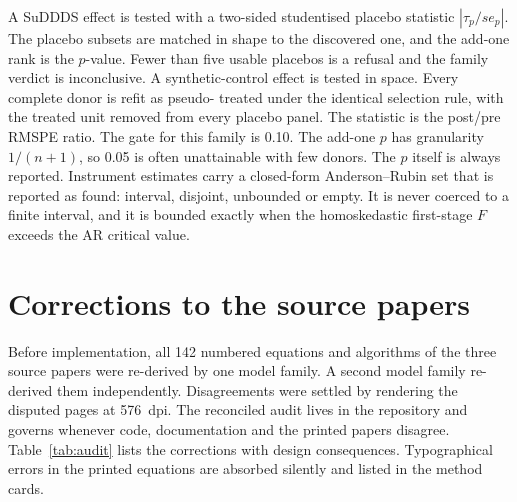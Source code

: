 \documentclass[11pt]{article}
\begin{document}
A SuDDDS effect is tested with a two-sided studentised placebo statistic $|\tau_p /
se_p|$. The placebo subsets are matched in shape to the discovered one, and the add-one
rank is the $p$-value. Fewer than five usable placebos is a refusal and the family
verdict is inconclusive. A synthetic-control effect is tested in space. Every complete donor is refit as pseudo-
treated under the identical selection rule, with the treated unit removed from every
placebo panel. The statistic is the post/pre RMSPE ratio. The gate for this family is
0.10. The add-one $p$ has granularity $1/(n+1)$, so 0.05 is often unattainable with few
donors. The $p$ itself is always reported. Instrument
estimates carry a closed-form Anderson--Rubin set that is reported as found: interval,
disjoint, unbounded or empty. It is never coerced to a finite interval, and it is bounded
exactly when the homoskedastic first-stage $F$ exceeds the AR critical value.

\section{Corrections to the source papers}\label{sec:audit}

Before implementation, all 142 numbered equations and algorithms of the three source
papers were re-derived by one model family. A second model family re-derived them
independently. Disagreements were settled by rendering the disputed pages at 576~dpi. The reconciled
audit lives in the repository and governs whenever code, documentation and the printed
papers disagree. Table~\ref{tab:audit} lists the corrections with design consequences.
Typographical errors in the printed equations are absorbed silently and listed in the
method cards.
\end{document}

